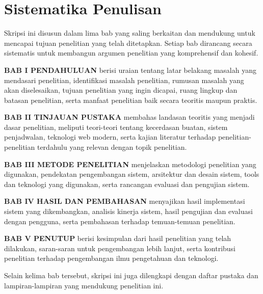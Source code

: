 \section{Sistematika Penulisan}

Skripsi ini disusun dalam lima bab yang saling berkaitan dan mendukung untuk mencapai tujuan penelitian yang telah ditetapkan. Setiap bab dirancang secara sistematis untuk membangun argumen penelitian yang komprehensif dan kohesif.

\noindent \textbf{BAB I PENDAHULUAN} berisi uraian tentang latar belakang masalah yang mendasari penelitian, identifikasi masalah penelitian, rumusan masalah yang akan diselesaikan, tujuan penelitian yang ingin dicapai, ruang lingkup dan batasan penelitian, serta manfaat penelitian baik secara teoritis maupun praktis.

\noindent \textbf{BAB II TINJAUAN PUSTAKA} membahas landasan teoritis yang menjadi dasar penelitian, meliputi teori-teori tentang kecerdasan buatan, sistem penjadwalan, teknologi web modern, serta kajian literatur terhadap penelitian-penelitian terdahulu yang relevan dengan topik penelitian.

\noindent \textbf{BAB III METODE PENELITIAN} menjelaskan metodologi penelitian yang digunakan, pendekatan pengembangan sistem, arsitektur dan desain sistem, tools dan teknologi yang digunakan, serta rancangan evaluasi dan pengujian sistem.

\noindent \textbf{BAB IV HASIL DAN PEMBAHASAN} menyajikan hasil implementasi sistem yang dikembangkan, analisis kinerja sistem, hasil pengujian dan evaluasi dengan pengguna, serta pembahasan terhadap temuan-temuan penelitian.

\noindent \textbf{BAB V PENUTUP} berisi kesimpulan dari hasil penelitian yang telah dilakukan, saran-saran untuk pengembangan lebih lanjut, serta kontribusi penelitian terhadap pengembangan ilmu pengetahuan dan teknologi.

Selain kelima bab tersebut, skripsi ini juga dilengkapi dengan daftar pustaka dan lampiran-lampiran yang mendukung penelitian ini.